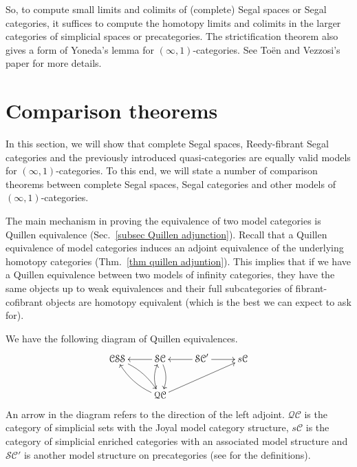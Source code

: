 \begin{refsection}
So, to compute small limits and colimits of (complete) Segal spaces or Segal categories, it suffices to compute the homotopy limits and colimits in the larger categories of simplicial spaces or precategories. The strictification theorem also gives a form of Yoneda's lemma for $(\infty,1)$-categories. See To\"en and Vezzosi's paper \cite{toen-vezzosi-segal-topoi-and-stacks-over-segal-categories} for more details.


\section{Comparison theorems}\label{sec comp thms}
In this section, we will show that complete Segal spaces, Reedy-fibrant Segal categories and the previously introduced quasi-categories are equally valid models for $(\infty,1)$-categories. To this end, we will state a number of comparison theorems between complete Segal spaces, Segal categories and other models of $(\infty,1)$-categories.

The main mechanism in proving the equivalence of two model categories is Quillen equivalence (Sec.~\ref{subsec Quillen adjunction}). Recall that a Quillen equivalence of model categories induces an adjoint equivalence of the underlying homotopy categories (Thm.~\ref{thm quillen adjuntion}).
This implies that if we have a Quillen equivalence between two models of infinity categories, they have the same objects up to weak equivalences and their full subcategories of fibrant-cofibrant objects are homotopy equivalent (which is the best we can expect to ask for).

We have the following diagram of Quillen equivalences.
$$\xymatrix{\mathcal{CSS}\ar@/^/[dr]&\mathcal{SC}\ar[l]\ar@/^/[d]&\mathcal{SC}'\ar[l]\ar[r]&s\mathcal{C}\\
&\mathcal{QC}\ar@/^/[ul]\ar@/^/[u]\ar[urr]}$$
An arrow in the diagram refers to the direction of the left adjoint. $\mathcal{QC}$ is the category of simplicial sets with the Joyal model category structure, $s\mathcal{C}$ is the category of simplicial enriched categories with an associated model structure and $\mathcal{SC}'$ is another model structure on precategories (see \cite{bergner-characterization-of-fibrant-segal-categories,joyal-quasicategories-vs-simplicial-categories} for the definitions).


\end{refsection}
